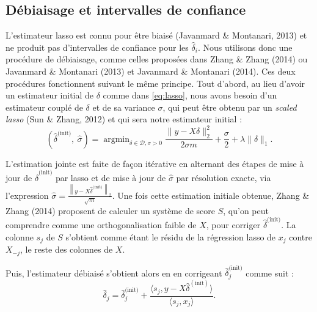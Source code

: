 \documentclass[12pt,a4paper]{reedthesis}
\newcommand \shiftset {\mathcal{D}}
\newcommand \shifts {\delta}
\DeclareMathOperator*{\argmin}{argmin}
\theoremstyle{definition}
\theoremstyle{definition}
\theoremstyle{definition}
\theoremstyle{remark}
\begin{document}
\hypertarget{duxe9biaisage-et-intervalles-de-confiance}{%
\subsection{Débiaisage et intervalles de confiance}\label{duxe9biaisage-et-intervalles-de-confiance}}

L'estimateur lasso est connu pour être biaisé (Javanmard \& Montanari, 2013) et ne produit pas d'intervalles de confiance pour les \(\hat{\shifts}_i\). Nous utilisons donc une procédure de débiaisage, comme celles proposées dans Zhang \& Zhang (2014) ou Javanmard \& Montanari (2013) et Javanmard \& Montanari (2014). Ces deux procédures fonctionnent suivant le même principe. Tout d'abord, au lieu d'avoir un estimateur initial de \(\shifts\) comme dans \eqref{eq:lasso}, nous avons besoin d'un estimateur couplé de \(\shifts\) et de sa variance \(\sigma\), qui peut être obtenu par un \emph{scaled lasso} (Sun \& Zhang, 2012) et qui sera notre estimateur initial :
\begin{equation*}
\left(\hat{\shifts}^{\text{(init)}},\ \hat{\sigma}\right) = \argmin_{\shifts \in \shiftset, \sigma > 0}  \frac{\|y - X \shifts\|_2^2}{2\sigma m} + \frac{\sigma}{2} + \lambda \|\shifts\|_1.
\end{equation*}
\newline

L'estimation jointe est faite de façon itérative en alternant des étapes de mise à jour de
\(\hat{\shifts}^{\text{(init)}}\) par lasso et de mise à jour de \(\hat{\sigma}\) par résolution exacte, via l'expression \(\hat{\sigma} = \frac{\left\|y - X \hat{\shifts}^{\text{(init)}}\right\|_2}{\sqrt{m}}\). Une fois cette estimation initiale obtenue, Zhang \& Zhang (2014) proposent de calculer un système de score \(S\), qu'on peut comprendre comme une orthogonalisation faible de \(X\), pour corriger \(\hat{\shifts}^{\text{(init)}}\). La colonne \(s_j\) de \(S\) s'obtient comme étant le résidu de la régression lasso de \(x_j\) contre \(X_{-j}\), le reste des colonnes de \(X\).

Puis, l'estimateur débiaisé s'obtient alors en en corrigeant \(\hat{\shifts}_j^{\text{(init)}}\) comme suit :
\begin{equation*}
\hat{\shifts}_j = \hat{\shifts}_j^{\text{(init)}} + \frac{\langle s_j,y-X\hat{\shifts}^{(\text{init})}\rangle}{\langle s_j,x_j\rangle}.
\end{equation*}
\newline
\end{document}
